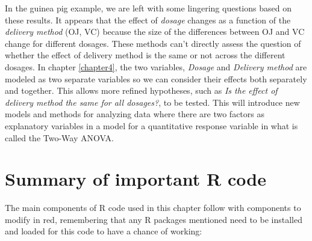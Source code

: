 \documentclass[]{book}
\theoremstyle{definition}
\theoremstyle{definition}
\theoremstyle{remark}
\begin{document}
In the guinea pig example, we are left with some lingering questions
based on these results. It appears that the effect of \emph{dosage}
changes as a function of the \emph{delivery method} (OJ, VC) because the
size of the differences between OJ and VC change for different dosages.
These methods can't directly assess the question of whether the effect
of delivery method is the same or not across the different dosages. In
chapter \ref{chapter4}, the two variables, \emph{Dosage} and
\emph{Delivery method} are modeled as two separate variables so we can
consider their effects both separately and together. This allows more
refined hypotheses, such as \emph{Is the effect of delivery method the
same for all dosages?}, to be tested. This will introduce new models and
methods for analyzing data where there are two factors as explanatory
variables in a model for a quantitative response variable in what is
called the Two-Way ANOVA.

\section{Summary of important R code}\label{section3-9}

The main components of R code used in this chapter follow with
components to modify in red, remembering that any R packages mentioned
need to be installed and loaded for this code to have a chance of
working:
\end{document}
